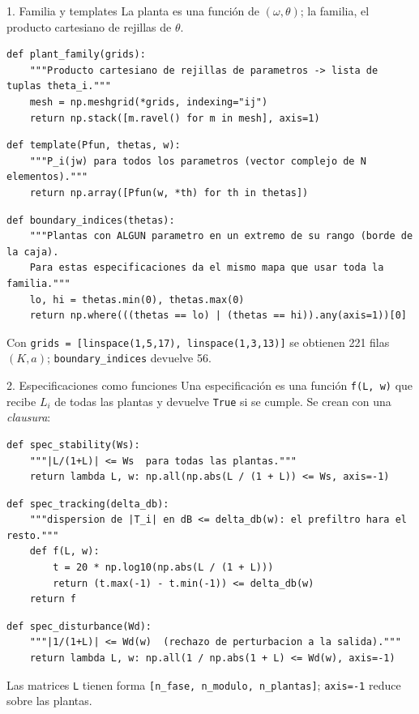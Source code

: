 \documentclass[aspectratio=169,11pt]{beamer}
\begin{document}
\begin{frame}[fragile]{1. Familia y templates}
\footnotesize
La planta es una función de $(\omega,\theta)$; la familia, el producto cartesiano de rejillas de $\theta$.
\footnotesize
\begin{verbatim}
def plant_family(grids):
    """Producto cartesiano de rejillas de parametros -> lista de tuplas theta_i."""
    mesh = np.meshgrid(*grids, indexing="ij")
    return np.stack([m.ravel() for m in mesh], axis=1)
\end{verbatim}

\footnotesize
\begin{verbatim}
def template(Pfun, thetas, w):
    """P_i(jw) para todos los parametros (vector complejo de N elementos)."""
    return np.array([Pfun(w, *th) for th in thetas])
\end{verbatim}
\footnotesize
\begin{verbatim}
def boundary_indices(thetas):
    """Plantas con ALGUN parametro en un extremo de su rango (borde de la caja).
    Para estas especificaciones da el mismo mapa que usar toda la familia."""
    lo, hi = thetas.min(0), thetas.max(0)
    return np.where(((thetas == lo) | (thetas == hi)).any(axis=1))[0]
\end{verbatim}
\scriptsize Con \texttt{grids = [linspace(1,5,17), linspace(1,3,13)]} se obtienen 221 filas $(K,a)$; \texttt{boundary\_indices} devuelve 56.
\end{frame}

\begin{frame}[fragile]{2. Especificaciones como funciones}
\footnotesize
Una especificación es una función \texttt{f(L, w)} que recibe $L_i$ de todas las plantas y devuelve \texttt{True} si se cumple. Se crean con una \emph{clausura}:
\footnotesize
\begin{verbatim}
def spec_stability(Ws):
    """|L/(1+L)| <= Ws  para todas las plantas."""
    return lambda L, w: np.all(np.abs(L / (1 + L)) <= Ws, axis=-1)
\end{verbatim}
\footnotesize
\begin{verbatim}
def spec_tracking(delta_db):
    """dispersion de |T_i| en dB <= delta_db(w): el prefiltro hara el resto."""
    def f(L, w):
        t = 20 * np.log10(np.abs(L / (1 + L)))
        return (t.max(-1) - t.min(-1)) <= delta_db(w)
    return f
\end{verbatim}
\footnotesize
\begin{verbatim}
def spec_disturbance(Wd):
    """|1/(1+L)| <= Wd(w)  (rechazo de perturbacion a la salida)."""
    return lambda L, w: np.all(1 / np.abs(1 + L) <= Wd(w), axis=-1)
\end{verbatim}
\scriptsize Las matrices \texttt{L} tienen forma \texttt{[n\_fase, n\_modulo, n\_plantas]}; \texttt{axis=-1} reduce sobre las plantas.
\end{frame}
\end{document}
